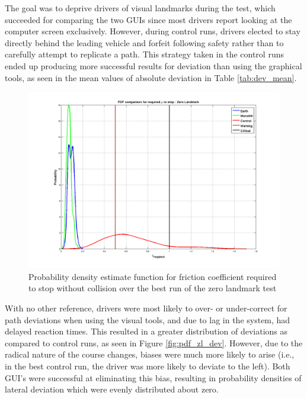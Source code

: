 \documentclass[twocolumn,10pt]{article}
\begin{document}
    The goal was to deprive drivers of visual landmarks during the test, which succeeded for comparing the two GUIs since most drivers report looking at the computer screen exclusively. However, during control runs, drivers elected to stay directly behind the leading vehicle and forfeit following safety rather than to carefully attempt to replicate a path. This strategy taken in the control runs ended up producing more successful results for deviation than using the graphical tools, as seen in the mean values of absolute deviation in Table \ref{tab:dev_mean}. 

    \begin{figure}[ht] \centering
      \includegraphics[width=\columnwidth]{../graphics/zero_landmark_mu_distribution.png}
      \caption{Probability density estimate function for friction coefficient required to stop without collision over the best run of the zero landmark test}
      \label{fig:pdf_zl_mu}
    \end{figure}

    With no other reference, drivers were most likely to over- or under-correct for path deviations when using the visual tools, and due to lag in the system, had delayed reaction times. This resulted in a greater distribution of deviations as compared to control runs, as seen in Figure \ref{fig:pdf_zl_dev}. However, due to the radical nature of the course changes, biases were much more likely to arise (i.e., in the best control run, the driver was more likely to deviate to the left). Both GUI's were successful at eliminating this bias, resulting in probability densities of lateral deviation which were evenly distributed about zero.
\end{document}
